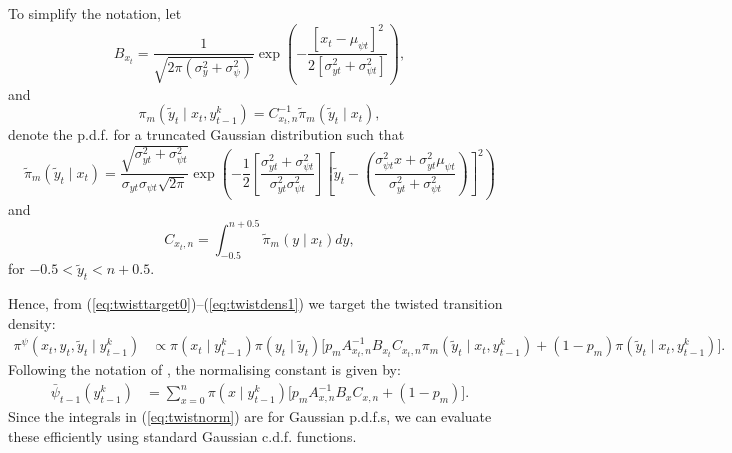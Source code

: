 \documentclass[a4paper]{article}
\begin{document}
To simplify the notation, let
\begin{equation*}
    B_{x_t} = \frac{1}{\sqrt{2\pi\left(\sigma^2_y + \sigma^2_{\psi}\right)}}\exp\left(-\frac{\left[x_t - \mu_{\psi t}\right]^2}{2\left[\sigma^2_{yt} + \sigma^2_{\psi t}\right]}\right),
\end{equation*}
and 
\begin{equation*}
    \pi_m\left(\tilde{y}_t \mid x_t, y^k_{t - 1}\right) = C^{-1}_{x_t, n} \tilde{\pi}_m\left(\tilde{y}_t \mid x_t\right),
\end{equation*}
denote the p.d.f. for a truncated Gaussian distribution such that
\begin{equation}
    \tilde{\pi}_m\left(\tilde{y}_t \mid x_t\right) = \frac{\sqrt{\sigma^2_{yt} + \sigma^2_{\psi t}}}{\sigma_{yt}\sigma_{\psi t}\sqrt{2\pi}} \exp\left(-\frac{1}{2}\left[\frac{\sigma^2_{yt} + \sigma^2_{\psi t}}{\sigma^2_{yt}\sigma^2_{\psi t}}\right]\left[\tilde{y}_t - \left(\frac{\sigma^2_{\psi t}x + \sigma^2_{yt}\mu_{\psi t}}{\sigma^2_{yt} + \sigma^2_{\psi t}}\right)\right]^2\right)
\end{equation}
and
\begin{equation}
    C_{x_t, n} = \int_{-0.5}^{n + 0.5} \tilde{\pi}_m\left(y \mid x_t\right) dy,
\end{equation}
for $-0.5 < \tilde{y}_t < n + 0.5$.

Hence, from (\ref{eq:twisttarget0})--(\ref{eq:twistdens1}) we target the twisted transition density:
\begin{align}
    \pi^{\psi}\left(x_t, y_t, \tilde{y}_t \mid y^k_{t - 1}\right) &\propto \pi\left(x_t \mid y^k_{t - 1}\right)\pi\left(y_t \mid \tilde{y}_t\right)\Big[p_m A^{-1}_{x_t, n}B_{x_t}C_{x_t, n} \pi_m\left(\tilde{y}_t \mid x_t, y^k_{t - 1}\right) + \left(1 - p_m\right) \pi\left(\tilde{y}_t \mid x_t, y^k_{t - 1}\right)\Big].\label{eq:twistdens2}
\end{align}
Following the notation of \cite{guarnieroetal:2017}, the normalising constant is given by:
\begin{align}
    \bar{\psi}_{t - 1}\left(y^k_{t - 1}\right) &= \sum_{x = 0}^n \pi\left(x \mid y^k_{t - 1}\right)\Big[ p_m A^{-1}_{x, n}B_{x} C_{x, n} + \left(1 - p_m\right)\Big].\label{eq:twistnorm}
\end{align}
Since the integrals in (\ref{eq:twistnorm}) are for Gaussian p.d.f.s, we can evaluate these efficiently using standard Gaussian c.d.f. functions.
\end{document}

